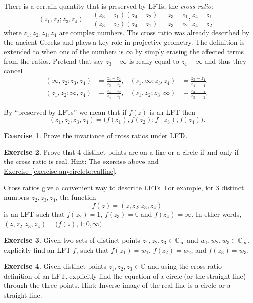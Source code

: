 \documentclass[12pt,openany]{book}
\newcommand{\C}{{\mathbb{C}}}
\newcommand{\myindex}[1]{#1\index{#1}}
\theoremstyle{plain}
\theoremstyle{remark}
\theoremstyle{definition}
\newenvironment{exbox}{%
    \def\FrameCommand{\vrule width 1pt \relax\hspace {10pt}}%
    \MakeFramed {\advance \hsize -\width \FrameRestore }%
}{%
    \endMakeFramed
}
\theoremstyle{exercise}
\newtheorem{exercise}{Exercise}[section]
\theoremstyle{example}
\newcommand{\exerciseref}[1]{\hyperref[#1]{Exercise~\ref*{#1}}}
\begin{document}
There is a certain quantity that is preserved by LFTs, the
\emph{\myindex{cross ratio}}:
\begin{equation*}
(z_1,z_2;z_3,z_4)
=
\frac{(z_3-z_1)(z_4-z_2)}{(z_3-z_2)(z_4-z_1)}
=
\frac{z_3-z_1}{z_3-z_2} : 
\frac{z_4-z_1}{z_4-z_2} ,
\end{equation*}
where $z_1,z_2,z_3,z_4$ are complex numbers.  The cross ratio
was already described by the ancient Greeks and plays a key role in
projective geometry.
The definition is extended to when one of the numbers is $\infty$ by simply
erasing the affected terms from the ratios.  Pretend that say $z_3-\infty$
is really equal to $z_4-\infty$ and thus they cancel.
\begin{align*}
(\infty,z_2;z_3,z_4)
& =
\frac{z_4-z_2}{z_3-z_2}
,
&
(z_1,\infty;z_3,z_4)
& =
\frac{z_3-z_1}{z_4-z_1}
,
\\
(z_1,z_2;\infty,z_4)
& =
\frac{z_4-z_2}{z_4-z_1}
,
& 
(z_1,z_2;z_3,\infty)
& =
\frac{z_3-z_1}{z_3-z_2} .
\end{align*}

By ``preserved by LFTs'' we mean that if $f(z)$ is an LFT then
\begin{equation*}
(z_1,z_2;z_3,z_4) =
\bigl(f(z_1),f(z_2);f(z_3),f(z_4)\bigr) .
\end{equation*}

\begin{exbox}
\begin{exercise}
Prove the invariance of cross ratios under LFTs.
\end{exercise}

\begin{exercise}
Prove that 4 distinct points are on a line or a circle if and only if the cross
ratio is real.
Hint: The exercise above and \exerciseref{exercise:anycircletorealline}.
\end{exercise}
\end{exbox}

Cross ratios give a convenient way to describe LFTs.  For example, 
for 3 distinct numbers $z_2,z_3,z_4$, the
function
\begin{equation*}
f(z) =
(z,z_2;z_3,z_4)
\end{equation*}
is an LFT such that $f(z_2) = 1$, $f(z_3)=0$ and $f(z_4) = \infty$.
In other words,
$(z,z_2;z_3,z_4) = 
\bigl(f(z),1;0,\infty\bigr)$.

\begin{exbox}
\begin{exercise}
Given two sets of distinct points $z_1,z_2,z_3 \in \C_\infty$
and $w_1,w_2,w_3 \in \C_\infty$, explicitly find an LFT $f$,
such that
$f(z_1) = w_1$,
$f(z_2) = w_2$, and
$f(z_3) = w_3$.
\end{exercise}

\begin{exercise}
Given distinct points $z_1,z_2,z_3 \in \C$ and
using the cross ratio definition of an LFT, explicitly find
the equation of a circle (or the straight line) through the three points.
Hint: Inverse image of the real line is a circle or a straight line.
\end{exercise}
\end{exbox}
\end{document}
